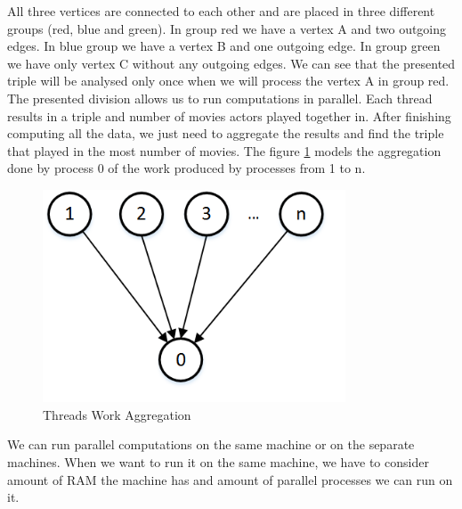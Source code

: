 All three vertices are connected to each other and are placed in three different groups (red, blue and green). In group red we have a vertex A and two outgoing edges. In blue group we have a vertex B and one outgoing edge. In group green we have only vertex C without any outgoing edges. We can see that the presented triple will be analysed only once when we will process the vertex A in group red.
\\
The presented division allows us to run computations in parallel. Each thread results in a triple and number of movies actors played together in. After finishing computing all the data, we just need to aggregate the results and find the triple that played in the most number of movies. The figure \ref{threads} models the aggregation done by process 0 of the work produced by processes from 1 to n.


\begin{figure}[ht!]
\centering
\includegraphics[width=90mm]{resources/threads.png}
\caption{Threads Work Aggregation}
\label{threads}
\end{figure}

We can run parallel computations on the same machine or on the separate machines. When we want to run it on the same machine, we have to consider amount of RAM the machine has and amount of parallel processes we can run on it.

